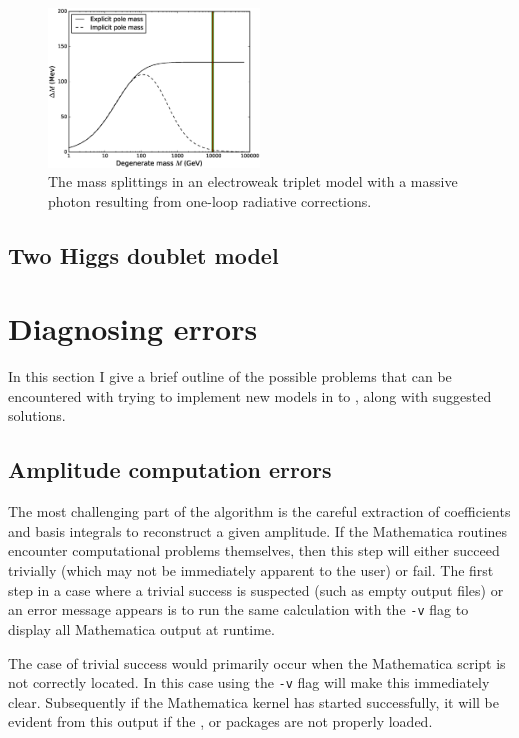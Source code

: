 \begin{figure}
\centering
\includegraphics[width=0.5\textwidth]{mass_splittings.eps}
\caption{The mass splittings in an electroweak triplet model with a massive photon resulting from one-loop radiative corrections.}\label{fig:1_loop}
\end{figure}



\subsection{Two Higgs doublet model}





\section{Diagnosing errors}\label{errors}

In this section I give a brief outline of the possible problems that can be encountered with trying to implement new models in to \mb, along with suggested solutions.

\subsection{Amplitude computation errors}

The most challenging part of the \mb algorithm is the careful extraction of coefficients and basis integrals to reconstruct a given amplitude.  If the Mathematica routines encounter computational problems themselves, then this step will either succeed trivially (which may not be immediately apparent to the user) or fail.  The first step in a case where a trivial success is suspected (such as empty output files) or an error message appears is to run the same calculation with the \lstinline{-v} flag to display all Mathematica output at runtime.

The case of trivial success would primarily occur when the Mathematica script is not correctly located.  In this case using the \lstinline{-v} flag will make this immediately clear.  Subsequently if the Mathematica kernel has started successfully, it will be evident from this output if the \feyncalcs, \feynarts or \tarcer packages are not properly loaded.

